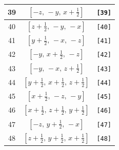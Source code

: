 \documentclass[fleqn,8pt]{jsarticle}
\begin{document}
\begin{longtable}{ccc}
39 & $\left[ - z,\, - y,\, x + \frac{1}{2} \right]$ & {\tt [39]} \\ \hline
40 & $\left[ z + \frac{1}{2},\, - y,\, - x \right]$ & {\tt [40]} \\ \hline
41 & $\left[ y + \frac{1}{2},\, - x,\, - z \right]$ & {\tt [41]} \\ \hline
42 & $\left[ - y,\, x + \frac{1}{2},\, - z \right]$ & {\tt [42]} \\ \hline
43 & $\left[ - y,\, - x,\, z + \frac{1}{2} \right]$ & {\tt [43]} \\ \hline
44 & $\left[ y + \frac{1}{2},\, x + \frac{1}{2},\, z + \frac{1}{2} \right]$ & {\tt [44]} \\ \hline
45 & $\left[ x + \frac{1}{2},\, - z,\, - y \right]$ & {\tt [45]} \\ \hline
46 & $\left[ x + \frac{1}{2},\, z + \frac{1}{2},\, y + \frac{1}{2} \right]$ & {\tt [46]} \\ \hline
47 & $\left[ - z,\, y + \frac{1}{2},\, - x \right]$ & {\tt [47]} \\ \hline
48 & $\left[ z + \frac{1}{2},\, y + \frac{1}{2},\, x + \frac{1}{2} \right]$ & {\tt [48]} \\
\end{longtable}
\end{document}
